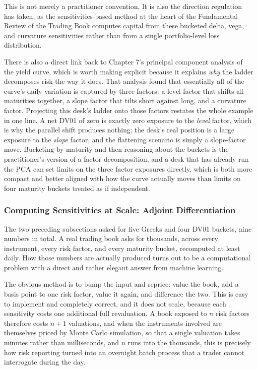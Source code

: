 \documentclass[../ai_in_finance]{subfiles}
\begin{document}
This is not merely a practitioner convention. It is also the direction regulation has taken, as the sensitivities-based method at the heart of the Fundamental Review of the Trading Book computes capital from these bucketed delta, vega, and curvature sensitivities rather than from a single portfolio-level loss distribution.

There is also a direct link back to Chapter 7's principal component analysis of the yield curve, which is worth making explicit because it explains \emph{why} the ladder decomposes risk the way it does. That analysis found that essentially all of the curve's daily variation is captured by three factors: a level factor that shifts all maturities together, a slope factor that tilts short against long, and a curvature factor. Projecting this desk's ladder onto those factors restates the whole example in one line. A net DV01 of zero is exactly zero exposure to the \emph{level} factor, which is why the parallel shift produces nothing; the desk's real position is a large exposure to the \emph{slope} factor, and the flattening scenario is simply a slope-factor move. Bucketing by maturity and then reasoning about the buckets is the practitioner's version of a factor decomposition, and a desk that has already run the PCA can set limits on the three factor exposures directly, which is both more compact and better aligned with how the curve actually moves than limits on four maturity buckets treated as if independent.

\subsubsection*{Computing Sensitivities at Scale: Adjoint Differentiation}
\label{sec:aad}

The two preceding subsections asked for five Greeks and four DV01 buckets, nine numbers in total. A real trading book asks for thousands, across every instrument, every risk factor, and every maturity bucket, recomputed at least daily. How those numbers are actually produced turns out to be a computational problem with a direct and rather elegant answer from machine learning.

The obvious method is to bump the input and reprice: value the book, add a basis point to one risk factor, value it again, and difference the two. This is easy to implement and completely correct, and it does not scale, because each sensitivity costs one additional full revaluation. A book exposed to $n$ risk factors therefore costs $n+1$ valuations, and when the instruments involved are themselves priced by Monte Carlo simulation, so that a single valuation takes minutes rather than milliseconds, and $n$ runs into the thousands, this is precisely how risk reporting turned into an overnight batch process that a trader cannot interrogate during the day.
\end{document}

